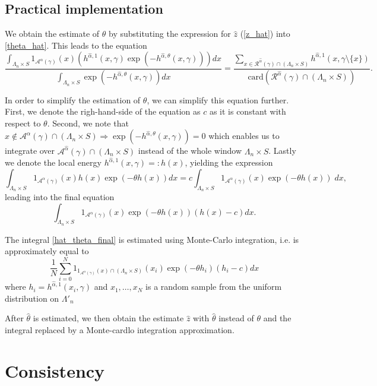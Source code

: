 \subsection{Practical implementation}
We obtain the estimate of $\theta$ by substituting the expression for $\hat z$ (\ref{z_hat}) into \ref{theta_hat}.
This leads to the equation
$$ 
\frac{\int_{\Lambda_n\times S} 1_{\mathcal A^\alpha (\gamma)}(x) (h^{\hat\alpha,1}(x,\gamma)\exp{\left(-h^{\hat\alpha,\theta}(x,\gamma)\right)}) dx} {  \int_{\Lambda_n\times S} \exp{\left( -h^{\hat\alpha,\theta}(x,\gamma)\right)} dx} 
= \frac {\sum_{x \in \mathcal R^{\hat\alpha}(\gamma)\cap (\Lambda_n\times S)} h^{\hat\alpha,1}(x,\gamma\setminus\{x\})} { \mbox{card}(\mathcal R^{\hat\alpha}(\gamma)\cap (\Lambda_n\times S)) }. 
$$

In order to simplify the estimation of $\theta$, we can simplify this equation further. First, we denote the righ-hand-side of the equation as $c$ as it  is constant with respect to $\theta$. Second, we note that $x \notin \mathcal A^\alpha(\gamma)\cap(\Lambda_n\times S)  \Rightarrow \exp{\left(-h^{\hat\alpha,\theta}(x,\gamma)\right)}= 0$ which enables us to integrate over $\mathcal A^{\hat\alpha}(\gamma) \cap (\Lambda_n\times S)$ instead of the whole window $\Lambda_n\times S$. Lastly we denote the local energy $h^{\hat\alpha,1}(x,\gamma) =: h(x)$, yielding the expression
$$ \int_{\Lambda_n\times S} 1_{\mathcal A^\alpha (\gamma)}(x)h(x) \exp{\left(-\theta h(x)\right)} dx = c \int_{\Lambda_n\times S} 1_{\mathcal A^\alpha (\gamma)}(x)\exp{\left(-\theta h(x)\right)}\;dx, $$
leading into the final equation
\begin{equation}\label{hat_theta_final} 
\int_{\Lambda_n\times S} 1_{\mathcal A^\alpha (\gamma)}(x)\exp{\left(-\theta h(x)\right)} (h(x) - c) dx .
\end{equation}

The integral \ref{hat_theta_final} is estimated using Monte-Carlo integration, i.e. is approximately equal to
$$ \frac 1N \sum_{i=0}^N 1_{1_{\mathcal A^\alpha (\gamma)}(x)\cap(\Lambda_n\times S)}(x_i) \exp{\left( - \theta h_i \right )} (h_i- c) dx $$
where $h_i = h^{\hat\alpha,1}(x_i, \gamma)$ and $x_1,\dots,x_N$ is a random sample from the uniform distribution on $\Lambda'_n$

After $\hat\theta$ is estimated, we then obtain the estimate $\hat z$ with $\hat\theta$ instead of $\theta$ and the integral replaced by a Monte-cardlo integration approximation.


\section{Consistency}
\tbd
